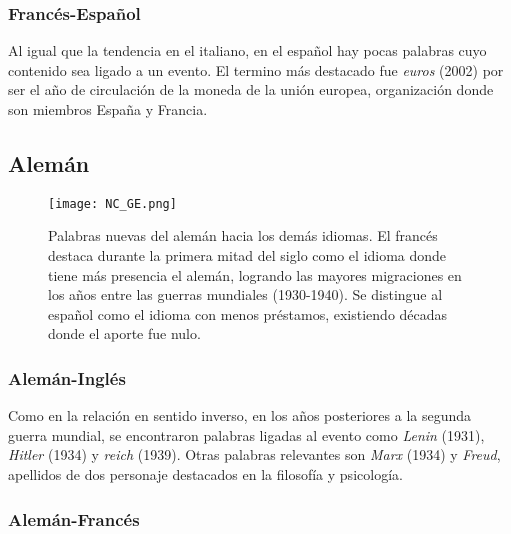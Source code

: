 \subsubsection*{Francés-Español}%

Al igual que la tendencia en el italiano, en el español hay pocas palabras cuyo contenido sea ligado a un evento. El termino más destacado fue \textit{euros} (2002) por ser el año de circulación de la moneda de la unión europea, organización donde son miembros España y Francia. 



\subsection{Alemán}%

\begin{figure}[h!]
	\centering
	\texttt{[image: NC\_GE.png]}
	\label{fig.NC_GE}
	\caption{Palabras nuevas del alemán hacia los demás idiomas. El francés destaca durante la primera mitad del siglo como el idioma donde tiene más presencia el alemán, logrando las mayores migraciones en los años entre las guerras mundiales (1930-1940). Se distingue al español como el idioma con menos préstamos, existiendo décadas donde el aporte fue nulo.}
\end{figure}




\subsubsection*{Alemán-Inglés}%

Como en la relación en sentido inverso, en los años posteriores a la segunda guerra mundial, se encontraron palabras ligadas al evento como  \textit{Lenin} (1931), \textit{Hitler} (1934) y \textit{reich} (1939).  Otras palabras relevantes son \textit{Marx} (1934) y \textit{Freud}, apellidos de dos personaje destacados en la filosofía y psicología. 


\subsubsection*{Alemán-Francés}%

